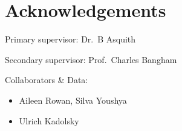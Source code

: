 \documentclass[slidescentered,compress]{beamer}
\begin{document}
\section*{Acknowledgements}

\frame
{

Primary supervisor: Dr.~B Asquith

Secondary supervisor: Prof.~Charles Bangham

\vspace{0.5cm}

Collaborators \& Data:
\begin{itemize}
\item Aileen Rowan, Silva Youshya
\item Ulrich Kadolsky 
\end{itemize}

\vspace{0.5cm}

\begin{figure}
\begin{center}
\end{center}
\end{figure}

}

\end{document}
